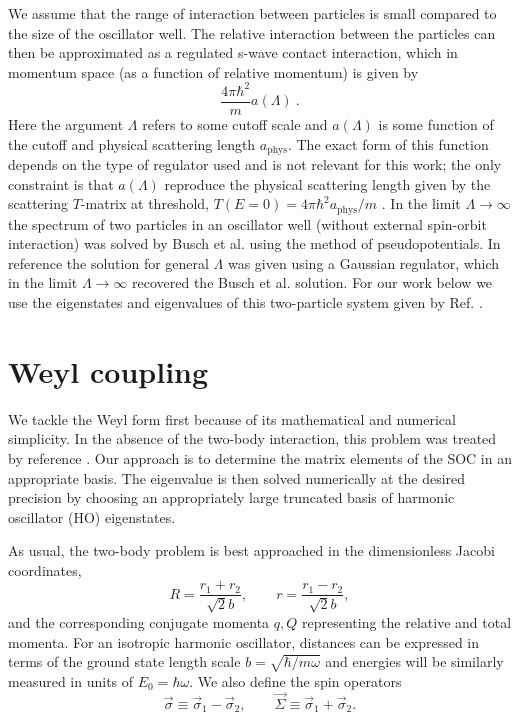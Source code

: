 \documentclass[%
 notitlepage,
 preprint,
showpacs,%
 amsmath,amssymb,
 aps,
pra,
]{revtex4-1}
\begin{document}
We assume that the range of interaction between particles is small compared to the size of the oscillator well.  The relative interaction between the particles can then be approximated as a regulated s-wave contact interaction, which in momentum space (as a function of relative momentum) is given by
\begin{equation}
\frac{4\pi \hbar^2}{m}a(\Lambda)\ .
\end{equation}
Here the argument $\Lambda$ refers to some cutoff scale and $a(\Lambda)$ is some function of the cutoff and physical scattering length $a_{\text{phys}}$.  The exact form of this function depends on the type of regulator used and is not relevant for this work; the only constraint is that $a(\Lambda)$ reproduce the physical scattering length given by the scattering $T$-matrix at threshold, $T(E=0)=4\pi\hbar^2 a_{\text{phys}}/m$ \cite{taylor2000}. In the limit $\Lambda\rightarrow \infty$ the spectrum of two particles in an oscillator well (without external spin-orbit interaction) was solved by Busch et al. \cite{Busch} using the method of pseudopotentials.  In reference  \cite{Luu:2006xv} the solution for general $\Lambda$ was given using a Gaussian regulator, which in the limit $\Lambda\rightarrow\infty$ recovered the Busch et al. solution.  For our work below we use the eigenstates and eigenvalues of this two-particle system given by Ref. \cite{Busch}.

\section{\label{sec:Weyl}Weyl coupling}
We tackle the Weyl form first because of its mathematical and numerical simplicity. In the absence of the two-body interaction, this problem was treated by reference \cite{0953-4075-46-13-134003}. Our approach is to determine the matrix elements of the SOC in an appropriate basis. The eigenvalue is then solved numerically at the desired precision by choosing an appropriately large truncated basis of harmonic oscillator (HO) eigenstates.

As usual, the two-body problem is best approached in the dimensionless Jacobi coordinates,
\begin{equation}
R=\frac{r_1+r_2}{\sqrt{2}b}, \qquad r=\frac{r_1-r_2}{\sqrt{2}b},
\end{equation}
and the corresponding conjugate momenta $q,Q$ representing the relative and total momenta. For an isotropic harmonic oscillator, distances can be expressed in terms of the ground state length scale $b=\sqrt{\hbar/m\omega}$ and energies will be similarly measured in units of $E_0=\hbar\omega$. We also define the spin operators
\begin{equation}
\vec{\sigma}\equiv\vec{\sigma}_1-\vec{\sigma}_2, \qquad \vec{\Sigma}\equiv\vec{\sigma}_1+\vec{\sigma}_2.
\end{equation}
\end{document}

